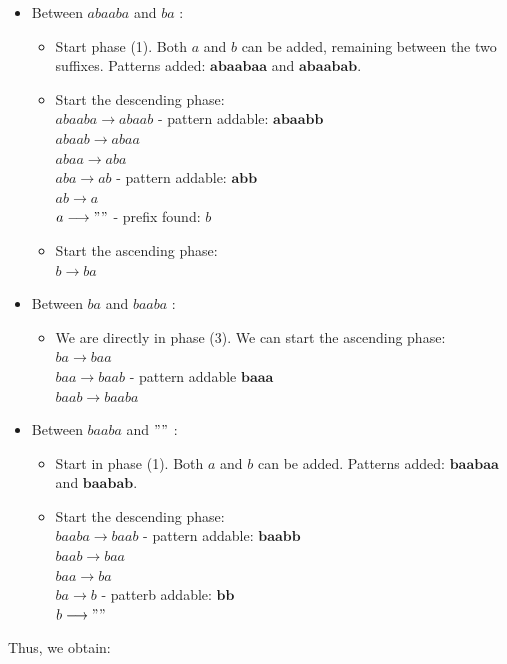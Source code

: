 \documentclass[conference]{IEEEtran}
\begin{document}
\begin{itemize}
\item Between $abaaba$ and $ba$ :
\begin{itemize}
\item Start phase (1). Both $a$ and $b$ can be added, remaining between the two suffixes. Patterns added: $\mathbf{abaabaa}$ and $\mathbf{abaabab}$.
\item Start the descending phase:\\
$abaaba \longrightarrow abaab$ - pattern addable: $\mathbf{abaabb}$\\
$abaab \longrightarrow abaa$\\
$abaa \longrightarrow aba$\\
$aba \longrightarrow ab$ - pattern addable: $\mathbf{abb}$\\
$ab \longrightarrow a$\\
$a \longrightarrow ""$ - prefix found: $b$
\item Start the ascending phase:\\
$b \longrightarrow ba$
\end{itemize}
\item Between $ba$ and $baaba$ :
\begin{itemize}
\item We are directly in phase (3). We can start the ascending phase:\\
$ba \longrightarrow baa$\\
$baa \longrightarrow baab$ - pattern addable $\mathbf{baaa}$\\
$baab\longrightarrow baaba$
\end{itemize}
\item Between $baaba$ and $""$ :
\begin{itemize}
\item Start in phase (1). Both $a$ and $b$ can be added. Patterns added: $\mathbf{baabaa}$ and $\mathbf{baabab}$.
\item Start the descending phase:\\
$baaba \longrightarrow baab$ - pattern addable: $\mathbf{baabb}$\\
$baab\longrightarrow baa$\\
$baa\longrightarrow ba$\\
$ba \longrightarrow b$ - patterb addable: $\mathbf{bb}$\\
$b \longrightarrow ""$
\end{itemize}
\end{itemize}
Thus, we obtain:
\end{document}
